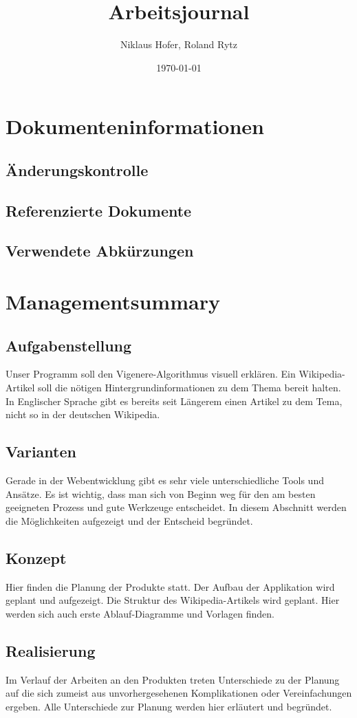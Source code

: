 \documentclass[11pt,paper=a4,final]{scrartcl}
\title{Arbeitsjournal}
\author{Niklaus Hofer, Roland Rytz}
\date{\today{}}
\begin{document}
\maketitle
\newpage
\section{Dokumenteninformationen}
\subsection{\"Anderungskontrolle}
\subsection{Referenzierte Dokumente}
\subsection{Verwendete Abk\"urzungen}
\tableofcontents
\section{Managementsummary}
\subsection{Aufgabenstellung}
Unser Programm soll den Vigenere-Algorithmus visuell erkl\"aren. Ein
Wikipedia-Artikel soll die n\"otigen Hintergrundinformationen zu dem Thema
bereit halten. In Englischer Sprache gibt es bereits seit L\"angerem einen
Artikel zu dem Tema, nicht so in der deutschen Wikipedia.
\subsection{Varianten}
Gerade in der Webentwicklung gibt es sehr viele unterschiedliche Tools und
Ans\"atze. Es ist wichtig, dass man sich von Beginn weg f\"ur den am besten
geeigneten Prozess und gute Werkzeuge entscheidet. In diesem Abschnitt werden
die M\"oglichkeiten aufgezeigt und der Entscheid begr\"undet.
\subsection{Konzept}
Hier finden die Planung der Produkte statt. Der Aufbau der Applikation wird
geplant und aufgezeigt. Die Struktur des Wikipedia-Artikels wird geplant. Hier
werden sich auch erste Ablauf-Diagramme und Vorlagen finden.
\subsection{Realisierung}
Im Verlauf der Arbeiten an den Produkten treten Unterschiede zu der Planung auf
die sich zumeist aus unvorhergesehenen Komplikationen oder Vereinfachungen
ergeben. Alle Unterschiede zur Planung werden hier erl\"autert und begr\"undet.
\end{document}
